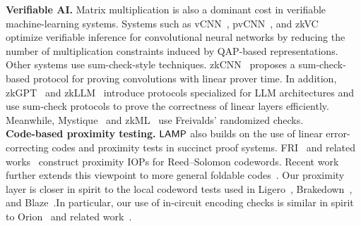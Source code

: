 

\noindent\textbf{Verifiable AI.}
Matrix multiplication is also a dominant cost in verifiable machine-learning
systems. Systems such as vCNN~\cite{lee2024vcnn}, pvCNN~\cite{pvCNN}, and
zkVC~\cite{zhang2025zkvc} optimize verifiable inference for convolutional neural
networks by reducing the number of multiplication constraints induced by
QAP-based representations. Other systems use sum-check-style techniques.
zkCNN~\cite{liu2021zkcnn} proposes a sum-check-based protocol for proving
convolutions with linear prover time. In addition, zkGPT~\cite{zkGPT} and
zkLLM~\cite{zkLLM} introduce protocols specialized for LLM architectures and
use sum-check protocols to prove the correctness of linear layers efficiently.
Meanwhile, Mystique~\cite{weng2021mystique} and zkML~\cite{chen2024zkml} use
Freivalds' randomized checks. \\

\noindent\textbf{Code-based proximity testing.}
\(\textsf{LAMP}\) also builds on the use of linear error-correcting codes and proximity
tests in succinct proof systems. FRI~\cite{FRI} and related
works~\cite{STIR,WHIR} construct proximity IOPs for
Reed--Solomon codewords. Recent work further extends this viewpoint to more
general foldable codes~\cite{basefold}.
Our proximity layer is closer in spirit to the local codeword tests used in
Ligero~\cite{Ligero}, Brakedown~\cite{brakedown}, and
Blaze~\cite{blaze}.In particular, our use of in-circuit encoding checks is similar in spirit to Orion~\cite{orion} and related work~\cite{restoring_orion}.

